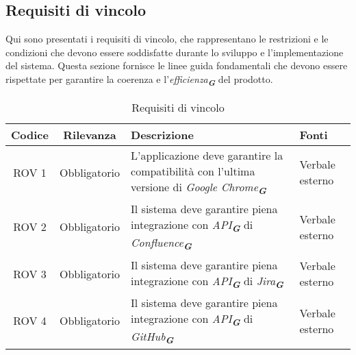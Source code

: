 \subsection{Requisiti di vincolo}
\label{sec:req_vincolo}
Qui sono presentati i requisiti di vincolo, che rappresentano le restrizioni e le condizioni
che devono essere soddisfatte durante lo sviluppo e l'implementazione del sistema. Questa
sezione fornisce le linee guida fondamentali che devono essere rispettate per garantire la
coerenza e l'\emph{efficienza}\textsubscript{\textit{\textbf{G}}} del prodotto.
\begin{table}[h!]
    \centering
    \renewcommand{\arraystretch}{1.6} %
    \begin{tabularx}{\textwidth}{|>{\centering\arraybackslash}c|>{\centering\arraybackslash}c|>{\centering\arraybackslash}X|>{\centering\arraybackslash}p{3cm}|} \hline
    \rowcolor[HTML]{FFD700} 
    \textbf{Codice} & \textbf{Rilevanza} & \textbf{Descrizione} & \textbf{Fonti} \\ \hline
    ROV 1 & Obbligatorio & L'applicazione deve garantire la compatibilità con l'ultima versione di \emph{Google Chrome}\textsubscript{\textit{\textbf{G}}} & Verbale esterno \\ \hline
    ROV 2 & Obbligatorio & Il sistema deve garantire piena integrazione con \emph{API}\textsubscript{\textit{\textbf{G}}} di \emph{Confluence}\textsubscript{\textit{\textbf{G}}} & Verbale esterno \\ \hline
    ROV 3 & Obbligatorio & Il sistema deve garantire piena integrazione con \emph{API}\textsubscript{\textit{\textbf{G}}} di \emph{Jira}\textsubscript{\textit{\textbf{G}}} & Verbale esterno\\ \hline
    ROV 4 & Obbligatorio & Il sistema deve garantire piena integrazione con \emph{API}\textsubscript{\textit{\textbf{G}}} di \emph{GitHub}\textsubscript{\textit{\textbf{G}}} & Verbale esterno \\ \hline
    \end{tabularx}
    \caption{Requisiti di vincolo}
    \label{tab:Requisiti_di_vincolo}
\end{table}

\newpage
